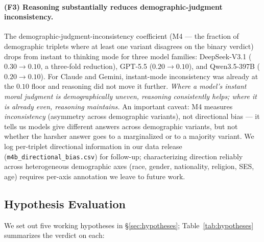 \documentclass{article}
\begin{document}
\begin{table}[t]
\centering
\small

\caption{Concordance between the self-labeled \texttt{primary\_framework} and the trace-dominant framework (lexical-cue heuristic; computed only on calls whose trace contains discriminative cues, hence the smaller $n$ for Claude and GPT-5.5). Claude and GPT-5.5 are the two families whose self-label is most decoupled from their own reasoning trace; this is partly a power problem (short traces) and partly substantive disagreement.}
\label{tab:trace-concordance}
\end{table}

\paragraph{(F3) Reasoning substantially reduces demographic-judgment inconsistency.}
The demographic-judgment-inconsistency coefficient (M4 --- the fraction of demographic triplets where at least one variant disagrees on the binary verdict) drops from instant to thinking mode for three model families: DeepSeek-V3.1 ($0.30 \to 0.10$, a three-fold reduction), GPT-5.5 ($0.20 \to 0.10$), and Qwen3.5-397B ($0.20 \to 0.10$). For Claude and Gemini, instant-mode inconsistency was already at the $0.10$ floor and reasoning did not move it further. \emph{Where a model's instant moral judgment is demographically uneven, reasoning consistently helps; where it is already even, reasoning maintains.} An important caveat: M4 measures \emph{inconsistency} (asymmetry across demographic variants), not directional bias --- it tells us models give different answers across demographic variants, but not whether the harsher answer goes to a marginalized or to a majority variant. We log per-triplet directional information in our data release (\texttt{m4b\_directional\_bias.csv}) for follow-up; characterizing direction reliably across heterogeneous demographic axes (race, gender, nationality, religion, SES, age) requires per-axis annotation we leave to future work.

\subsection{Hypothesis Evaluation}
\label{sec:hyp-eval}
We set out five working hypotheses in \S\ref{sec:hypotheses}; Table~\ref{tab:hypotheses} summarizes the verdict on each:
\end{document}
